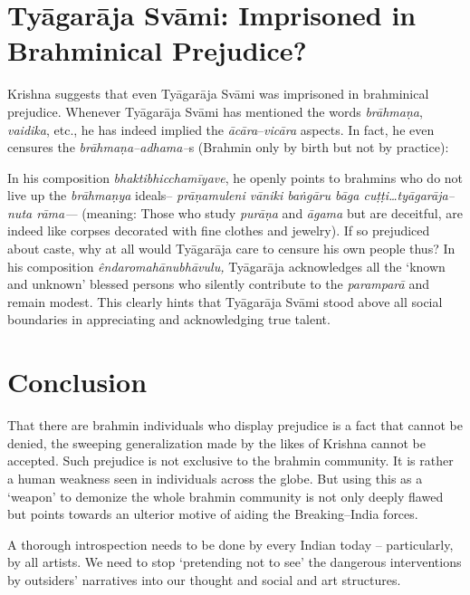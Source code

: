 \section*{Tyāgarāja Svāmi: Imprisoned in Brahminical Prejudice?}

Krishna suggests that even Tyāgarāja Svāmi was imprisoned in brahminical prejudice.  Whenever Tyāgarāja Svāmi has mentioned the words \textit{brāhmaṇa}, \textit{vaidika}, etc., he has indeed implied the \textit{ācāra}–\textit{vicāra} aspects. In fact, he even censures the \textit{brāhmaṇa–adhama–}s (Brahmin only by birth but not by practice):

In his composition \textit{bhakti}\textit{bhicchamīyave}, he openly points to brahmins who do not live up the \textit{brāhmaṇya} ideals– \textit{prāṇamuleni vāniki baṅgāru bāga cuṭṭi…tyāgarāja–nuta rāma—} (meaning: Those who study \textit{purāṇa} and \textit{āgama} but are deceitful, are indeed like corpses decorated with fine clothes and jewelry). If so prejudiced about caste, why at all would Tyāgarāja care to censure his own people thus? In his composition \textit{êndaro}\textit{mahānubhāvulu,} Tyāgarāja acknowledges all the ‘known and unknown’ blessed persons who silently contribute to the \textit{paramparā} and remain modest. This clearly hints that Tyāgarāja Svāmi stood above all social boundaries in appreciating and acknowledging true talent.


\section*{Conclusion}

That there are brahmin individuals who display prejudice is a fact that cannot be denied, the sweeping generalization made by the likes of Krishna cannot be accepted. Such prejudice is not exclusive to the brahmin community. It is rather a human weakness seen in individuals across the globe. But using this as a ‘weapon’ to demonize the whole brahmin community is not only deeply flawed but points towards an ulterior motive of aiding the Breaking–India forces.

A thorough introspection needs to be done by every Indian today – particularly, by all artists. We need to stop ‘pretending not to see’ the dangerous interventions by outsiders’ narratives into our thought and social and art structures.


